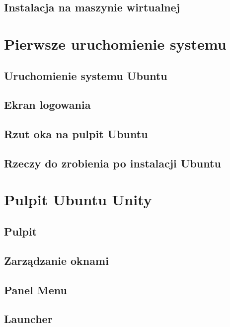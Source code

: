 \documentclass[a4paper,11pt,oneside]{mwart}
\begin{document}
        \subsection{Instalacja na maszynie wirtualnej}
                           
\section{Pierwsze uruchomienie systemu}
        \label{sec:pierwsze_uruchomienie}
        \subsection{Uruchomienie systemu Ubuntu}
                
        \subsection{Ekran logowania}
                
        \subsection{Rzut oka na pulpit Ubuntu}
                
        \subsection{Rzeczy do zrobienia po instalacji Ubuntu}
                \label{sec:rzeczy_do_zrobienia_po_instalacji}
                
\section{Pulpit Ubuntu Unity}
        \label{pulpit_unity}
        \subsection{Pulpit}
        \subsection{Zarządzanie oknami}
        \subsection{Panel Menu}
        \subsection{Launcher}
\end{document}
